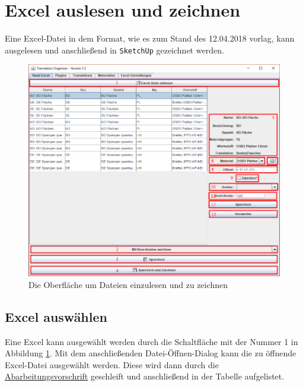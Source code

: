 \documentclass{book}
\newcommand{\sketchup}{\texttt{SketchUp}\xspace}
\begin{document}
		\section{Excel auslesen und zeichnen}\label{excelread}
			Eine Excel-Datei in dem Format, wie es zum Stand des 12.04.2018 vorlag, kann ausgelesen und anschließend in \sketchup gezeichnet werden.
			\begin{figure}
				\centering
				\includegraphics[scale=0.48]{pics/assisttool/readExcel-v13.png}
				\caption{Die Oberfläche um Dateien einzulesen und zu zeichnen}
				\label{fig:read Excel}
			\end{figure}
			\subsection{Excel auswählen}
				Eine Excel kann ausgewählt werden durch die Schaltfläche mit der Nummer 1 in Abbildung \ref{fig:read Excel}. Mit dem anschließenden Datei-Öffnen-Dialog kann die zu öffnende Excel-Datei ausgewählt werden. Diese wird dann durch die \hyperref[REC - Ablauf]{Abarbeitungsvorschrift} geschleift und anschließend in der Tabelle aufgelistet. 
\end{document}
